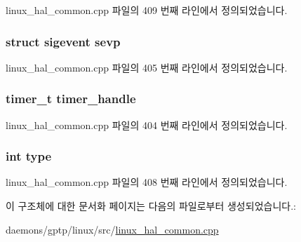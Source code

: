 linux\+\_\+hal\+\_\+common.\+cpp 파일의 409 번째 라인에서 정의되었습니다.

\subsubsection[{\texorpdfstring{sevp}{sevp}}]{\setlength{\rightskip}{0pt plus 5cm}struct sigevent sevp}\hypertarget{struct_linux_timer_queue_action_arg_a9baffc52a0a03ab47948763b47ab6d91}{}\label{struct_linux_timer_queue_action_arg_a9baffc52a0a03ab47948763b47ab6d91}


linux\+\_\+hal\+\_\+common.\+cpp 파일의 405 번째 라인에서 정의되었습니다.

\subsubsection[{\texorpdfstring{timer\+\_\+handle}{timer_handle}}]{\setlength{\rightskip}{0pt plus 5cm}timer\+\_\+t timer\+\_\+handle}\hypertarget{struct_linux_timer_queue_action_arg_a1f6b0d9bef8b2411e159a7753850235d}{}\label{struct_linux_timer_queue_action_arg_a1f6b0d9bef8b2411e159a7753850235d}


linux\+\_\+hal\+\_\+common.\+cpp 파일의 404 번째 라인에서 정의되었습니다.

\subsubsection[{\texorpdfstring{type}{type}}]{\setlength{\rightskip}{0pt plus 5cm}int type}\hypertarget{struct_linux_timer_queue_action_arg_ac765329451135abec74c45e1897abf26}{}\label{struct_linux_timer_queue_action_arg_ac765329451135abec74c45e1897abf26}


linux\+\_\+hal\+\_\+common.\+cpp 파일의 408 번째 라인에서 정의되었습니다.



이 구조체에 대한 문서화 페이지는 다음의 파일로부터 생성되었습니다.\+:\begin{DoxyCompactItemize}
\item 
daemons/gptp/linux/src/\hyperlink{linux__hal__common_8cpp}{linux\+\_\+hal\+\_\+common.\+cpp}\end{DoxyCompactItemize}
